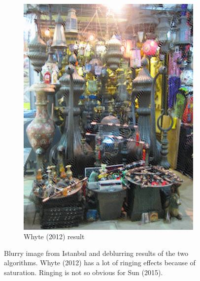 \documentclass[10pt,twocolumn,letterpaper]{article}
\begin{document}
\begin{figure}
\begin{center}
\begin{subfigure}{0.23\textwidth}
\includegraphics[width=0.9\linewidth]{istanbul_whyte}
\caption{Whyte \etal (2012) result}
\label{fig:subim6}
\end{subfigure}
 
\caption{Blurry image from Istanbul and deblurring results of the two algorithms. Whyte \etal (2012) has a lot of ringing effects because of saturation. Ringing is not so obvious for Sun \etal (2015).}
\label{fig:image3}
\end{center}
\end{figure}
\end{document}
